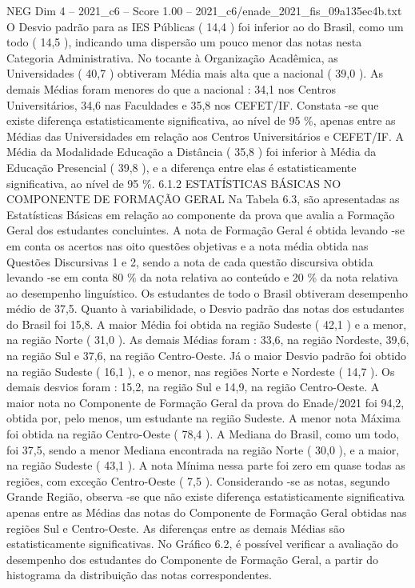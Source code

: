 \begin{textsample}{NEG Dim 4 – 2021\_c6 – Score 1.00 – 2021\_c6/enade\_2021\_fis\_09a135ec4b.txt}
O Desvio padrão para as IES Públicas ( 14,4 ) foi inferior ao do Brasil, como um todo ( 14,5 ), indicando uma dispersão um pouco menor das notas nesta Categoria Administrativa.
No tocante à Organização Acadêmica, as Universidades ( 40,7 ) obtiveram Média mais alta que a nacional ( 39,0 ).
As demais Médias foram menores do que a nacional : 34,1 nos Centros Universitários, 34,6 nas Faculdades e 35,8 nos CEFET/IF.
Constata -se que existe diferença estatisticamente significativa, ao nível de 95 \%, apenas entre as Médias das Universidades em relação aos Centros Universitários e CEFET/IF.
A Média da Modalidade Educação a Distância ( 35,8 ) foi inferior à Média da Educação Presencial ( 39,8 ), e a diferença entre elas é estatisticamente significativa, ao nível de 95 \%. 6.1.2 ESTATÍSTICAS BÁSICAS NO COMPONENTE DE FORMAÇÃO GERAL Na Tabela 6.3, são apresentadas as Estatísticas Básicas em relação ao componente da prova que avalia a Formação Geral dos estudantes concluintes.
A nota de Formação Geral é obtida levando -se em conta os acertos nas oito questões objetivas e a nota média obtida nas Questões Discursivas 1 e 2, sendo a nota de cada questão discursiva obtida levando -se em conta 80 \% da nota relativa ao conteúdo e 20 \% da nota relativa ao desempenho linguístico.
Os estudantes de todo o Brasil obtiveram desempenho médio de 37,5.
Quanto à variabilidade, o Desvio padrão das notas dos estudantes do Brasil foi 15,8.
A maior Média foi obtida na região Sudeste ( 42,1 ) e a menor, na região Norte ( 31,0 ).
As demais Médias foram : 33,6, na região Nordeste, 39,6, na região Sul e 37,6, na região Centro-Oeste.
Já o maior Desvio padrão foi obtido na região Sudeste ( 16,1 ), e o menor, nas regiões Norte e Nordeste ( 14,7 ).
Os demais desvios foram : 15,2, na região Sul e 14,9, na região Centro-Oeste.
A maior nota no Componente de Formação Geral da prova do Enade/2021 foi 94,2, obtida por, pelo menos, um estudante na região Sudeste.
A menor nota Máxima foi obtida na região Centro-Oeste ( 78,4 ).
A Mediana do Brasil, como um todo, foi 37,5, sendo a menor Mediana encontrada na região Norte ( 30,0 ), e a maior, na região Sudeste ( 43,1 ).
A nota Mínima nessa parte foi zero em quase todas as regiões, com exceção Centro-Oeste ( 7,5 ).
Considerando -se as notas, segundo Grande Região, observa -se que não existe diferença estatisticamente significativa apenas entre as Médias das notas do Componente de Formação Geral obtidas nas regiões Sul e Centro-Oeste.
As diferenças entre as demais Médias são estatisticamente significativas.
No Gráfico 6.2, é possível verificar a avaliação do desempenho dos estudantes do Componente de Formação Geral, a partir do histograma da distribuição das notas correspondentes.

\end{textsample}
